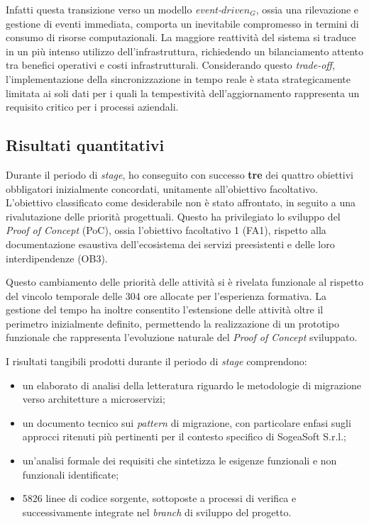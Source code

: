        \vspace{0.2 em}
        \noindent Infatti questa transizione verso un modello \textit{event-$driven_G$}, ossia una rilevazione e gestione di eventi immediata, comporta un inevitabile compromesso in termini di consumo di risorse computazionali. La maggiore reattività del sistema si traduce in un più intenso utilizzo dell'infrastruttura, richiedendo un bilanciamento attento tra benefici operativi e costi infrastrutturali. Considerando questo \textit{trade-off}, l'implementazione della sincronizzazione in tempo reale è stata strategicamente limitata ai soli dati per i quali la tempestività dell'aggiornamento rappresenta un requisito critico per i processi aziendali. 

        
        \subsection{Risultati quantitativi}
        Durante il periodo di \textit{stage}, ho conseguito con successo \textbf{tre} dei quattro obiettivi obbligatori inizialmente concordati, unitamente all'obiettivo facoltativo. L'obiettivo classificato come desiderabile non è stato affrontato, in seguito a una rivalutazione delle priorità progettuali. Questo ha privilegiato lo sviluppo del \textit{Proof of Concept} (PoC), ossia l'obiettivo facoltativo 1 (FA1), rispetto alla documentazione esaustiva dell'ecosistema dei servizi preesistenti e delle loro interdipendenze (OB3).

        \vspace{0.2 em}
        \noindent Questo cambiamento delle priorità delle attività si è rivelata funzionale al rispetto del vincolo temporale delle 304 ore allocate per l'esperienza formativa. La gestione del tempo ha inoltre consentito l'estensione delle attività oltre il perimetro inizialmente definito, permettendo la realizzazione di un prototipo funzionale che rappresenta l'evoluzione naturale del \textit{Proof of Concept} sviluppato.

        \vspace{0.2 em}
        \noindent I risultati tangibili prodotti durante il periodo di \textit{stage} comprendono:
        \begin{itemize}
            \item un elaborato di analisi della letteratura riguardo le metodologie di migrazione verso architetture a microservizi;
            \item un documento tecnico sui \textit{pattern} di migrazione, con particolare enfasi sugli approcci ritenuti più pertinenti per il contesto specifico di SogeaSoft S.r.l.;
            \item un'analisi formale dei requisiti che sintetizza le esigenze funzionali e non funzionali identificate;
            \item 5826 linee di codice sorgente, sottoposte a processi di verifica e successivamente integrate nel \textit{branch} di sviluppo del progetto.
        \end{itemize}
        
